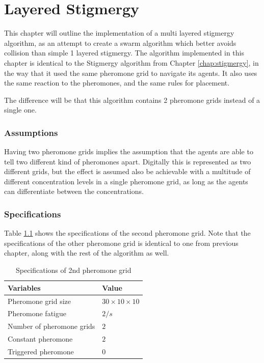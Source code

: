 
\chapter{Layered Stigmergy}
\label{chap:lay_stig}

This chapter will outline the implementation of a multi layered stigmergy algorithm, as an attempt to create a swarm algorithm which better avoids collision than simple 1 layered stigmergy. The algorithm implemented in this chapter is identical to the Stigmergy algorithm from Chapter \ref{chap:stigmergy}, in the way that it used the same pheromone grid to navigate its agents. It also uses the same reaction to the pheromones, and the same rules for placement. 

The difference will be that this algorithm contains 2 pheromone grids instead of a single one.

\subsection{Assumptions}
Having two pheromone grids implies the assumption that the agents are able to tell two different kind of pheromones apart. Digitally this is represented as two different grids, but the effect is assumed also be achievable with a multitude of different concentration levels in a single pheromone grid, as long as the agents can differentiate between the concentrations. 


\subsection{Specifications}
Table \ref{tab:vars_12} shows the specifications of the second pheromone grid. Note that the specifications of the other pheromone grid is identical to one from previous chapter, along with the rest of the algorithm as well.

\begin{table}[H]
\centering
\begin{tabularx}{0.6\textwidth}{ll}
\toprule
\textbf{Variables}     & \textbf{Value}  \\ \hline
Pheromone grid size    & $30 \times 10 \times 10$ \\ \hline
Pheromone fatigue      & $2/s$               \\
Number of pheromone grids      & $2$               \\
Constant pheromone  & $2$             \\
Triggered pheromone & $0$               \\
\end{tabularx}
\caption{Specifications of 2nd pheromone grid}
\label{tab:vars_12}
\end{table}

